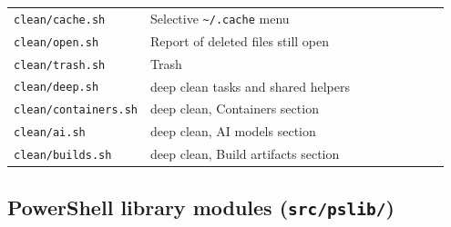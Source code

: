 \documentclass[11pt,a4paper]{article}
\begin{document}
\begin{center}
\begin{longtable}{@{}p{0.25\linewidth} p{0.70\linewidth}@{}}
\texttt{clean/cache.sh}           & Selective \texttt{\textasciitilde{}/.cache} menu \\
\texttt{clean/open.sh}            & Report of deleted files still open \\
\texttt{clean/trash.sh}           & Trash \\
\texttt{clean/deep.sh}            & deep clean tasks and shared helpers \\
\texttt{clean/containers.sh}      & deep clean, Containers section \\
\texttt{clean/ai.sh}              & deep clean, AI models section \\
\texttt{clean/builds.sh}          & deep clean, Build artifacts section \\
\bottomrule
\end{longtable}
\end{center}

\subsection{PowerShell library modules (\texttt{src/pslib/})}
\end{document}
